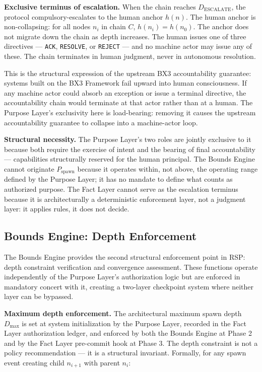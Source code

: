\medskip
\noindent\textbf{Exclusive terminus of escalation.} When the chain reaches $D_{\mathrm{ESCALATE}}$, the protocol compulsory-escalates to the human anchor $h(n)$. The human anchor is non-collapsing: for all nodes $n_i$ in chain $C$, $h(n_i) = h(n_0)$. The anchor does not migrate down the chain as depth increases. The human issues one of three directives --- \texttt{ACK}, \texttt{RESOLVE}, or \texttt{REJECT} --- and no machine actor may issue any of these. The chain terminates in human judgment, never in autonomous resolution.

This is the structural expression of the upstream BX3 accountability guarantee: systems built on the BX3 Framework fail upward into human consciousness. If any machine actor could absorb an exception or issue a terminal directive, the accountability chain would terminate at that actor rather than at a human. The Purpose Layer's exclusivity here is load-bearing: removing it causes the upstream accountability guarantee to collapse into a machine-actor loop.

\medskip
\noindent\textbf{Structural necessity.} The Purpose Layer's two roles are jointly exclusive to it because both require the exercise of intent and the bearing of final accountability --- capabilities structurally reserved for the human principal. The Bounds Engine cannot originate $P_{\mathrm{spawn}}$ because it operates within, not above, the operating range defined by the Purpose Layer; it has no mandate to define what counts as authorized purpose. The Fact Layer cannot serve as the escalation terminus because it is architecturally a deterministic enforcement layer, not a judgment layer: it applies rules, it does not decide.

\subsection{Bounds Engine: Depth Enforcement}
\label{sec:bounds_depth}

The Bounds Engine provides the second structural enforcement point in RSP: depth constraint verification and convergence assessment. These functions operate independently of the Purpose Layer's authorization logic but are enforced in mandatory concert with it, creating a two-layer checkpoint system where neither layer can be bypassed.

\medskip
\noindent\textbf{Maximum depth enforcement.} The architectural maximum spawn depth $D_{\max}$ is set at system initialization by the Purpose Layer, recorded in the Fact Layer authorization ledger, and enforced by both the Bounds Engine at Phase 2 and by the Fact Layer pre-commit hook at Phase 3. The depth constraint is not a policy recommendation --- it is a structural invariant. Formally, for any spawn event creating child $n_{i+1}$ with parent $n_i$:

